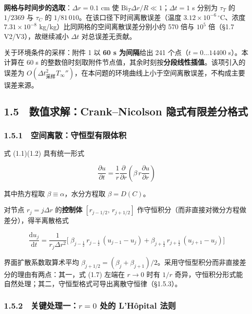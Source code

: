 \documentclass[12pt,a4paper]{ctexart}
\begin{document}
\textbf{网格与时间步的选取}：$\Delta r=0.1$ cm 使 $\mathrm{Bi}_T\Delta r/R\ll1$；$\Delta t=1$ s 分别为 $\tau_T$ 的 $1/2369$ 与 $\tau_C$ 的 $1/81\,010$。在该口径下时间离散误差（温度 $3.12\times10^{-6}\,^\circ$C、浓度 $7.31\times10^{-8}$ kg/kg）比同网格的空间离散误差分别小约 570 倍与 $10^5$ 倍（§1.7 V2/V3），故继续减小 $\Delta t$ 对总误差无贡献。

关于环境条件的采样：附件 1 以 \textbf{60 s 为间隔}给出 241 个点（$t=0\dots14400$ s）。本计算在 60 s 的整数倍时刻取附件节点值，其余时刻按\textbf{分段线性插值}。该项引入的误差为 $O(\Delta t_{\text{采样}}^{2}T_\infty'')$，在本问题的环境曲线上小于空间离散误差，不构成主要误差来源。

\subsection*{1.5　数值求解：Crank–Nicolson 隐式有限差分格式}

\subsubsection*{1.5.1　空间离散：守恒型有限体积}

式 (1.1)(1.2) 具有统一形式

\begin{equation}
\frac{\partial u}{\partial t}=\frac{1}{r}\frac{\partial}{\partial r}\!\left(\beta\,r\frac{\partial u}{\partial r}\right)
\tag{1.7}
\end{equation}

其中热方程取 $\beta\equiv\alpha$，水分方程取 $\beta=D(C)$。

对节点 $r_j=j\Delta r$ 的\textbf{控制体} $[r_{j-1/2},\,r_{j+1/2}]$ 作守恒积分（而非直接对微分方程做差分），得半离散格式

\begin{equation}
\frac{\mathrm{d}u_j}{\mathrm{d}t}=\frac{1}{r_j\Delta r^{2}}\Big[\;\beta_{j-\frac12}\,r_{j-\frac12}\,(u_{j-1}-u_j)+\beta_{j+\frac12}\,r_{j+\frac12}\,(u_{j+1}-u_j)\Big]
\tag{1.8}
\end{equation}

界面扩散系数取算术平均 $\beta_{j+1/2}=(\beta_j+\beta_{j+1})/2$。采用守恒型积分而非直接差分的理由有两点：其一，式 (1.7) 左端在 $r\to0$ 时有 $1/r$ 奇异，守恒积分形式能自然处理；其二，守恒型格式可导出离散守恒律（§1.5.3）。

\subsubsection*{1.5.2　关键处理一：$r=0$ 处的 L'Hôpital 法则}
\end{document}
